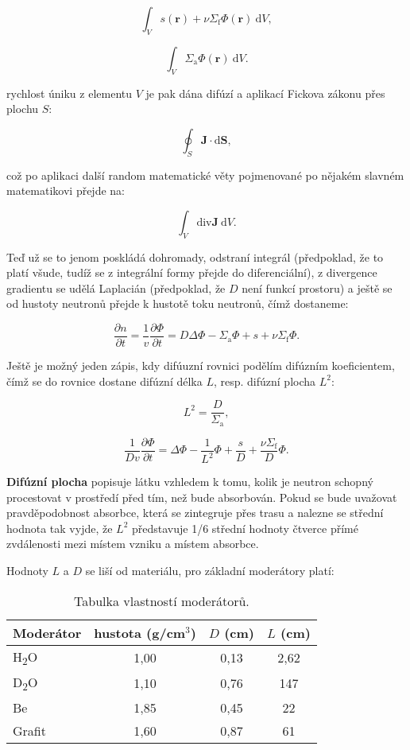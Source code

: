 $$ \boxed{\int_V s(\textbf{r}) + \nu \Sigma_\text{f} \Phi(\textbf{r}) \: \text{d} V,} $$

$$ \boxed{\int_V \Sigma_\text{a} \Phi(\textbf{r}) \: \text{d} V.} $$

rychlost úniku z elementu $V$ je pak dána difúzí a aplikací Fickova zákonu přes plochu $S$:

$$ \oint_S \textbf{J} \cdot \text{d} \textbf{S}, $$

což po aplikaci další random matematické věty pojmenované po nějakém slavném matematikovi přejde na:

$$ \boxed{\int_V \text{div} \textbf{J} \: \text{d} V.} $$

Teď už se to jenom poskládá dohromady, odstraní integrál (předpoklad, že to platí všude, tudíž se z integrální formy přejde do diferenciální), z divergence gradientu se udělá Laplacián (předpoklad, že $D$ není funkcí prostoru) a ještě se od hustoty neutronů přejde k hustotě toku neutronů, čímž dostaneme:

\begin{equation}
    \boxed{
        \dfrac{\partial n}{\partial t} = \dfrac{1}{v} \dfrac{\partial \Phi}{\partial t} = D \Delta \Phi - \Sigma_\text{a} \Phi + s + \nu \Sigma_\text{f} \Phi.
    }
\end{equation}

Ještě je možný jeden zápis, kdy difúuzní rovnici podělím difúzním koeficientem, čímž se do rovnice dostane difúzní délka $L$, resp. difúzní plocha $L^2$:

$$ L^2 = \dfrac{D}{\Sigma_\text{a}}, $$

\begin{equation}
    \boxed{
        \dfrac{1}{D v} \dfrac{\partial \Phi}{\partial t} = \Delta \Phi - \dfrac{1}{L^2} \Phi + \dfrac{s}{D} + \dfrac{\nu \Sigma_\text{f}}{D} \Phi.
    }
\end{equation}

\textbf{Difúzní plocha} popisuje látku vzhledem k tomu, kolik je neutron schopný procestovat v prostředí před tím, než bude absorbován. Pokud se bude uvažovat pravděpodobnost absorbce, která se zintegruje přes trasu a nalezne se střední hodnota tak vyjde, že $L^2$ představuje 1/6 střední hodnoty čtverce přímé zvdálenosti mezi místem vzniku a místem absorbce.

Hodnoty $L$ a $D$ se liší od materiálu, pro základní moderátory platí:

\begin{table}[h!]
    \centering
    \begin{tabular}{lccc}
    \toprule
    \textbf{Moderátor} & \textbf{hustota (g/cm$^3$)} & $D$ \textbf{(cm)} & $L$ \textbf{(cm)} \\ \midrule
    H\textsubscript{2}O & 1,00 & 0,13 & 2,62 \\
    D\textsubscript{2}O & 1,10 & 0,76 & 147 \\
    Be & 1,85 & 0,45 & 22 \\
    Grafit & 1,60 & 0,87 & 61 \\ \bottomrule
    \end{tabular}
    \caption{Tabulka vlastností moderátorů.}
\end{table}
    

